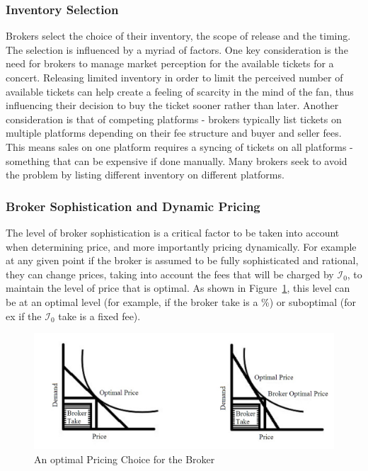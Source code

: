 \documentclass[letterpaper, 12pt]{article}
\begin{document}
\subsubsection{Inventory Selection}
Brokers select the choice of their inventory, the scope of release and the timing. The selection is influenced by a myriad of factors. One key consideration is the need for brokers to manage market perception for the available tickets for a concert. Releasing limited inventory in order to limit the perceived number of available tickets can help create a feeling of scarcity in the mind of the fan, thus influencing their decision to buy the ticket sooner rather than later. Another consideration is that of competing platforms - brokers typically list tickets on multiple platforms depending on their fee structure and buyer and seller fees. This means sales on one platform requires a syncing of tickets on all platforms - something that can be expensive if done manually. Many brokers seek to avoid the problem by listing different inventory on different platforms.
\subsubsection{Broker Sophistication and Dynamic Pricing}
The level of broker sophistication is a critical factor to be taken into account when determining price, and more importantly pricing dynamically. For example at any given point if the broker is assumed to be fully sophisticated and rational, they can change prices, taking into account the fees that will be charged by $\mathcal{I}_0$, to maintain the level of price that is optimal. As shown in Figure~\ref{fig:demc}, this level can be at an optimal level (for example, if the broker take is a \%) or suboptimal (for ex if the $\mathcal{I}_0$ take is a fixed fee). 
\begin{figure}[h]
	\centering
	\includegraphics[scale=.3]{IMG_20151201_112640407.jpg}
	\caption{An optimal Pricing Choice for the Broker}
	\label{fig:demc}
\end{figure}
\end{document}
